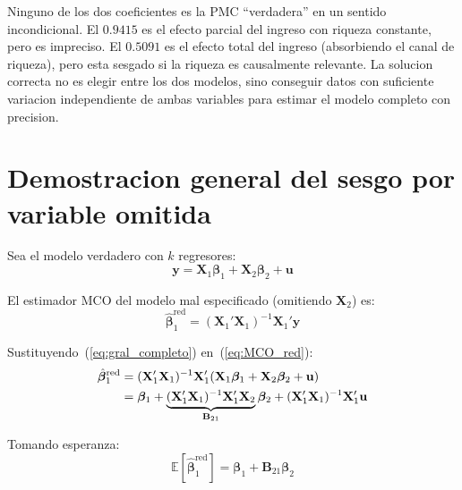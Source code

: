 \documentclass[12pt, letterpaper]{article}
\theoremstyle{remark}
\newcommand{\E}{\mathbb{E}}
\begin{document}
\begin{clave}
  Ninguno de los dos coeficientes es la PMC ``verdadera'' en un sentido
  incondicional. El $0.9415$ es el efecto parcial del ingreso con riqueza
  constante, pero es impreciso. El $0.5091$ es el efecto total del ingreso
  (absorbiendo el canal de riqueza), pero esta sesgado si la riqueza es
  causalmente relevante. La solucion correcta no es elegir entre los dos
  modelos, sino conseguir datos con suficiente variacion independiente de
  ambas variables para estimar el modelo completo con precision.
\end{clave}

\appendix

\section{Demostracion general del sesgo por variable omitida}

Sea el modelo verdadero con $k$ regresores:
\begin{equation}
  \mathbf{y} = \mathbf{X}_1\boldsymbol{\beta}_1 + \mathbf{X}_2\boldsymbol{\beta}_2 + \mathbf{u}
  \label{eq:gral_completo}
\end{equation}

El estimador MCO del modelo mal especificado (omitiendo $\mathbf{X}_2$) es:
\begin{equation}
  \hat{\boldsymbol{\beta}}_1^{\text{red}}
    = (\mathbf{X}_1'\mathbf{X}_1)^{-1}\mathbf{X}_1'\mathbf{y}
  \label{eq:MCO_red}
\end{equation}

Sustituyendo~(\ref{eq:gral_completo}) en~(\ref{eq:MCO_red}):
\begin{align}
  \hat{\boldsymbol{\beta}}_1^{\text{red}}
  &= (\mathbf{X}_1'\mathbf{X}_1)^{-1}\mathbf{X}_1'
     (\mathbf{X}_1\boldsymbol{\beta}_1 + \mathbf{X}_2\boldsymbol{\beta}_2 + \mathbf{u})
  \notag\\
  &= \boldsymbol{\beta}_1
   + \underbrace{(\mathbf{X}_1'\mathbf{X}_1)^{-1}\mathbf{X}_1'\mathbf{X}_2}_{\mathbf{B}_{21}}
     \boldsymbol{\beta}_2
   + (\mathbf{X}_1'\mathbf{X}_1)^{-1}\mathbf{X}_1'\mathbf{u}
  \label{eq:sesgo_gral}
\end{align}

Tomando esperanza:
\begin{equation}
  \E[\hat{\boldsymbol{\beta}}_1^{\text{red}}]
    = \boldsymbol{\beta}_1 + \mathbf{B}_{21}\boldsymbol{\beta}_2
  \label{eq:esperanza_sesgo}
\end{equation}
\end{document}
